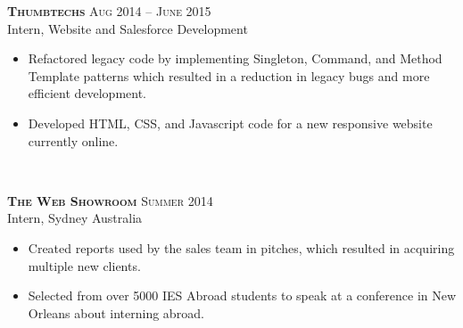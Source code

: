 \documentclass[10pt]{article} %
\begin{document}
{\raggedright

\large \textsc{\textbf{Thumbtechs}} \hfill \small{\textsc{Aug 2014 -- June 2015}}\\
Intern, Website and Salesforce Development}
\normalsize{
\begin{itemize}
	\item Refactored legacy code by implementing Singleton, Command, and Method Template patterns which resulted in a  reduction in legacy bugs and more efficient development. 
	\item	Developed HTML, CSS, and Javascript code for a new responsive website currently online.
\end{itemize}
}\\
\hfill

{\raggedright \large \textsc{\textbf{The Web Showroom}} \hfill \small{\textsc{Summer 2014}}\\
Intern, Sydney Australia}
\normalsize{
\begin{itemize}
	\item Created reports used by the sales team in pitches, which resulted in acquiring multiple new clients.
	\item Selected from over 5000 IES Abroad students to speak at a conference in New Orleans about interning abroad.
\end{itemize}
}\\
\hfill

\end{document}
